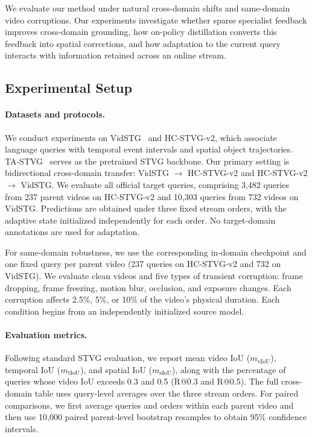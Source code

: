 \documentclass[10pt,twocolumn,letterpaper]{article}
\newcommand{\mvIoU}{\ensuremath{m_{\mathrm{vIoU}}}}
\newcommand{\mtIoU}{\ensuremath{m_{\mathrm{tIoU}}}}
\newcommand{\msIoU}{\ensuremath{m_{\mathrm{sIoU}}}}
\begin{document}
We evaluate our method under natural cross-domain shifts and
same-domain video corruptions. Our experiments investigate
whether sparse specialist feedback improves cross-domain grounding,
how on-policy distillation converts this feedback into spatial
corrections, and how adaptation to the current query interacts
with information retained across an online stream.

\subsection{Experimental Setup}
\label{sec:experimental-setup}

\paragraph{Datasets and protocols.}
We conduct experiments on VidSTG~\cite{vidstg} and HC-STVG-v2,
which associate language queries with temporal event intervals
and spatial object trajectories. TA-STVG~\cite{tastvg} serves as
the pretrained STVG backbone. Our primary setting is bidirectional
cross-domain transfer: VidSTG $\rightarrow$ HC-STVG-v2 and
HC-STVG-v2 $\rightarrow$ VidSTG. We evaluate all official target
queries, comprising 3,482 queries from 237 parent videos on
HC-STVG-v2 and 10,303 queries from 732 videos on VidSTG.
Predictions are obtained under three fixed stream orders, with
the adaptive state initialized independently for each order.
No target-domain annotations are used for adaptation.

For same-domain robustness, we use the corresponding in-domain
checkpoint and one fixed query per parent video (237 queries
on HC-STVG-v2 and 732 on VidSTG). We evaluate clean videos
and five types of transient corruption: frame dropping, frame
freezing, motion blur, occlusion, and exposure changes. Each
corruption affects 2.5\%, 5\%, or 10\% of the video's physical
duration. Each condition begins from an independently initialized
source model.

\paragraph{Evaluation metrics.}
Following standard STVG evaluation, we report mean video IoU
(\mvIoU), temporal IoU (\mtIoU), and spatial IoU (\msIoU),
along with the percentage of queries whose video IoU exceeds
0.3 and 0.5 (R@0.3 and R@0.5). The full cross-domain table
uses query-level averages over the three stream orders. For
paired comparisons, we first average queries and orders within
each parent video and then use 10,000 paired parent-level
bootstrap resamples to obtain 95\% confidence intervals.
\end{document}
